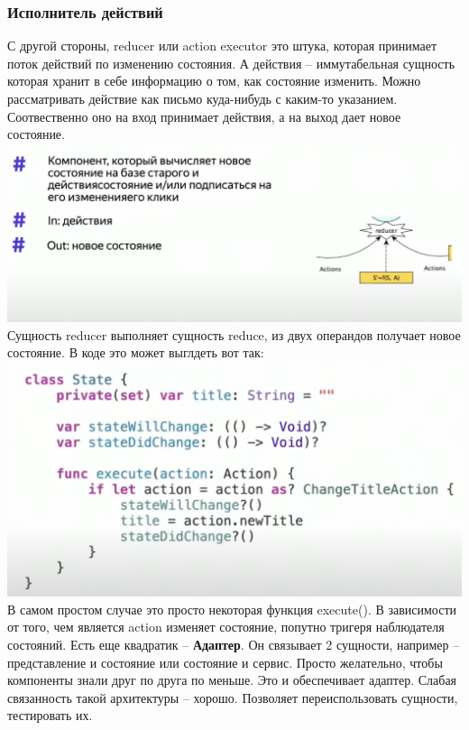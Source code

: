 \documentclass{article}
\begin{document}
    \subsubsection{Исполнитель действий}
    С другой стороны, reducer или action executor это штука, которая принимает поток действий по изменению состояния. А действия -- иммутабельная сущность которая хранит в себе информацию о том, как состояние изменить. Можно рассматривать действие как письмо куда-нибудь с каким-то указанием. Соотвественно оно на вход принимает действия, а на выход дает новое состояние. 
    \includegraphics[scale = 0.5]{pic/Снимок экрана 2023-07-30 в 22.18.39.png}
    \newline
    Сущность reducer выполняет сущность reduce, из двух операндов получает новое состояние. 
    \newline
    В коде это может выглдеть вот так: 
    \newline
    \includegraphics[scale = 0.5]{pic/Снимок экрана 2023-07-30 в 22.19.35.png}
    \newline
    В самом простом случае это просто некоторая функция execute(). В зависимости от того, чем является action изменяет состояние, попутно тригеря наблюдателя состояний. 
    \newline
    Есть еще квадратик -- \textbf{Адаптер}. Он связывает 2 сущности, например -- представление и состояние или состояние и сервис. Просто желательно, чтобы компоненты знали друг по друга по меньше. Это и обеспечивает адаптер. Слабая связанность такой архитектуры -- хорошо. Позволяет переиспользовать сущности, тестировать их.
\end{document}
